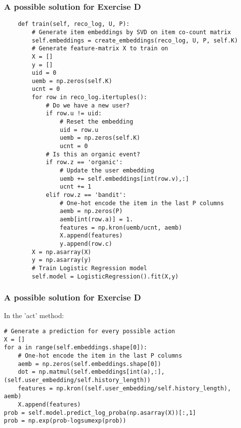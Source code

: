 \begin{frame}[fragile]
  \frametitle{A possible solution for Exercise D}
\begin{tiny}
\begin{verbatim}
    def train(self, reco_log, U, P):
        # Generate item embeddings by SVD on item co-count matrix
        self.embeddings = create_embeddings(reco_log, U, P, self.K)
        # Generate feature-matrix X to train on
        X = []
        y = []
        uid = 0
        uemb = np.zeros(self.K)
        ucnt = 0
        for row in reco_log.itertuples():
            # Do we have a new user?
            if row.u != uid:
                # Reset the embedding
                uid = row.u
                uemb = np.zeros(self.K)
                ucnt = 0
            # Is this an organic event?
            if row.z == 'organic':
                # Update the user embedding
                uemb += self.embeddings[int(row.v),:]
                ucnt += 1
            elif row.z == 'bandit':
                # One-hot encode the item in the last P columns
                aemb = np.zeros(P)
                aemb[int(row.a)] = 1.
                features = np.kron(uemb/ucnt, aemb)
                X.append(features)
                y.append(row.c)
        X = np.asarray(X)
        y = np.asarray(y)
        # Train Logistic Regression model
        self.model = LogisticRegression().fit(X,y)
\end{verbatim}
\end{tiny}
\end{frame}

\begin{frame}[fragile]
  \frametitle{A possible solution for Exercise D}
In the 'act' method:
\begin{tiny}
\begin{verbatim}
# Generate a prediction for every possible action
X = []
for a in range(self.embeddings.shape[0]):
    # One-hot encode the item in the last P columns
    aemb = np.zeros(self.embeddings.shape[0])
    dot = np.matmul(self.embeddings[int(a),:],(self.user_embedding/self.history_length))
    features = np.kron((self.user_embedding/self.history_length), aemb)
    X.append(features)
prob = self.model.predict_log_proba(np.asarray(X))[:,1]
prob = np.exp(prob-logsumexp(prob))
\end{verbatim}
\end{tiny}
\end{frame}
